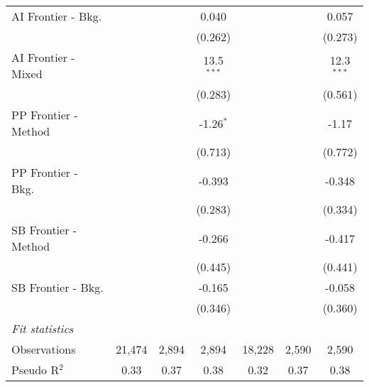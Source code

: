 \begin{tabular}{lcccccc}
   AI Frontier - Bkg.   &                &               & 0.040          &               &               & 0.057\\   
                        &                &               & (0.262)        &               &               & (0.273)\\   
   AI Frontier - Mixed  &                &               & 13.5$^{***}$   &               &               & 12.3$^{***}$\\   
                        &                &               & (0.283)        &               &               & (0.561)\\   
   PP Frontier - Method &                &               & -1.26$^{*}$    &               &               & -1.17\\   
                        &                &               & (0.713)        &               &               & (0.772)\\   
   PP Frontier - Bkg.   &                &               & -0.393         &               &               & -0.348\\   
                        &                &               & (0.283)        &               &               & (0.334)\\   
   SB Frontier - Method &                &               & -0.266         &               &               & -0.417\\   
                        &                &               & (0.445)        &               &               & (0.441)\\   
   SB Frontier - Bkg.   &                &               & -0.165         &               &               & -0.058\\   
                        &                &               & (0.346)        &               &               & (0.360)\\   
   \midrule
   \emph{Fit statistics}\\
   Observations         & 21,474         & 2,894         & 2,894          & 18,228        & 2,590         & 2,590\\  
   Pseudo R$^2$         & 0.33           & 0.37          & 0.38           & 0.32          & 0.37          & 0.38\\  
   

\end{tabular}

